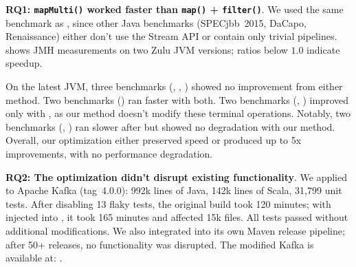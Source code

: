 
\textbf{RQ1: \texttt{mapMulti()} worked faster than \texttt{map()} + \texttt{filter()}}.
We used the same benchmark as \citet{moller2020eliminating}, since other Java benchmarks (SPECjbb~2015, DaCapo, Renaissance) either don't use the Stream API or contain only trivial pipelines.
 shows JMH measurements on two Zulu JVM versions; ratios below \(1.0\) indicate speedup.

\begin{table}
\end{table}

On the latest JVM, three benchmarks (, , ) showed no improvement from either method.
Two benchmarks () ran faster with both.
Two benchmarks (, ) improved only with \streamliner{}, as our method doesn't modify these terminal operations.
Notably, two benchmarks (, ) ran slower after \streamliner{} but showed no degradation with our method.
Overall, our optimization either preserved speed or produced up to 5x improvements, with no performance degradation.

\textbf{RQ2: The optimization didn't disrupt existing functionality}.
We applied \hone{} to Apache Kafka (tag~4.0.0): 992k lines of Java, 142k lines of Scala, 31,799 unit tests.
After disabling 13 flaky tests, the original build took 120 minutes; with \hone{} injected into , it took 165 minutes and affected 15k  files.
All tests passed without additional modifications.
We also integrated \hone{} into its own Maven release pipeline; after 50+ releases, no functionality was disrupted.
The modified Kafka is available at: .
